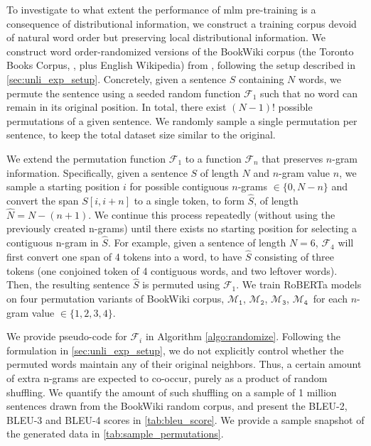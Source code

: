 \documentclass[letterpaper, 12pt]{report}
\newcommand{\RI}{$\mathcal{M}_{\texttt{1}}$}
\newcommand{\RII}{$\mathcal{M}_{\texttt{2}}$}
\newcommand{\RIII}{$\mathcal{M}_{\texttt{3}}$}
\newcommand{\RIV}{$\mathcal{M}_{\texttt{4}}$}
\begin{document}
To investigate to what extent the performance of \acrshort{mlm} pre-training is a consequence of distributional information, we construct a training corpus devoid of natural word order but preserving local distributional information. We construct word order-randomized versions of the BookWiki corpus (the Toronto Books Corpus, \citep{zhu2015aligning}, plus English Wikipedia) from \citet{liu-et-al-2019-roberta}, following the setup described in \autoref{sec:unli_exp_setup}. %
Concretely, given a sentence $S$ containing $N$ words, we permute the sentence using a seeded random function $\mathcal{F}_1$ such that no word can remain in its original position. In total, there exist $(N-1)!$ possible permutations of a given sentence. We randomly sample a single permutation per sentence, to keep the total dataset size similar to the original.

We extend the permutation function $\mathcal{F}_1$ to a function $\mathcal{F}_n$ that preserves $n$-gram information. Specifically, given a sentence $S$ of length $N$ and $n$-gram value $n$, we sample a starting position $i$ for possible contiguous $n$-grams $\in \{0, N-n\}$ and convert the span $S[i,i+n]$ to a single token, to form $\hat{S}$, of length $\hat{N} = N - (n+1)$. We continue this process repeatedly (without using the previously created n-grams) until there exists no starting position for selecting a contiguous n-gram in $\hat{S}$. For example, given a sentence of length $N=6$, $\mathcal{F}_4$ will first convert one span of 4 tokens into a word, to have $\hat{S}$ consisting of three tokens (one conjoined token of 4 contiguous words, and two leftover words).
Then, the resulting sentence $\hat{S}$ is permuted using $\mathcal{F}_1$. We train RoBERTa models on four permutation variants of BookWiki corpus, \RI, \RII, \RIII, \RIV\ for each $n$-gram value $ \in {\{1,2,3,4\}}$.

We provide pseudo-code for $\mathcal{F}_i$ in Algorithm \autoref{algo:randomize}.
Following the formulation in \autoref{sec:unli_exp_setup}, we do not explicitly control whether the permuted words maintain any of their original neighbors. Thus, a certain amount of extra n-grams are expected to co-occur, purely as a product of random shuffling. We quantify the amount of such shuffling on a sample of 1 million sentences drawn from the BookWiki random corpus, and present the BLEU-2, BLEU-3 and BLEU-4 scores in \autoref{tab:bleu_score}. We provide a sample snapshot of the generated data in \autoref{tab:sample_permutations}.
\end{document}
